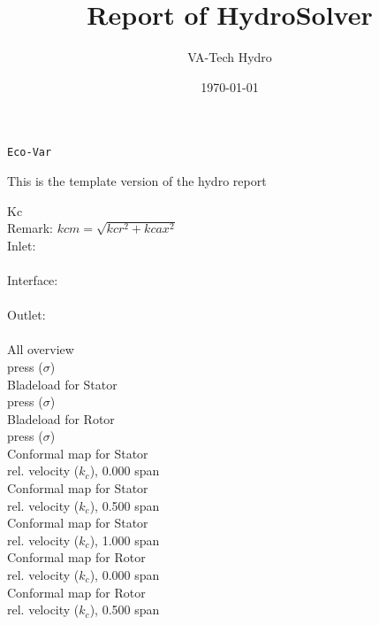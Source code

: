 \documentclass[10pt,a4paper]{article}
\begin{document}
\author{VA-Tech Hydro}
\title{Report of HydroSolver}
\date{\today}
\maketitle
{\huge \begin{verbatim}Eco-Var\end{verbatim}}

This is the template version of the hydro report\\
\newpage

\newpage
{\huge Kc} \\
Remark: $kcm = \sqrt{kcr^2+kcax^2}$\\
Inlet: \\
\\
Interface: \\
\\
Outlet: \\
\\
\newpage
{\huge All overview}\\ press ($\sigma$) \\
\newpage
{\huge Bladeload for Stator}\\ press ($\sigma$) \\
\newpage
{\huge Bladeload for Rotor}\\ press ($\sigma$) \\
\newpage
{\huge Conformal map for Stator}\\ rel. velocity ($k_c$), 0.000 span \\
\newpage
{\huge Conformal map for Stator}\\ rel. velocity ($k_c$), 0.500 span \\
\newpage
{\huge Conformal map for Stator}\\ rel. velocity ($k_c$), 1.000 span \\
\newpage
{\huge Conformal map for Rotor}\\ rel. velocity ($k_c$), 0.000 span \\
\newpage
{\huge Conformal map for Rotor}\\ rel. velocity ($k_c$), 0.500 span \\
\end{document}
